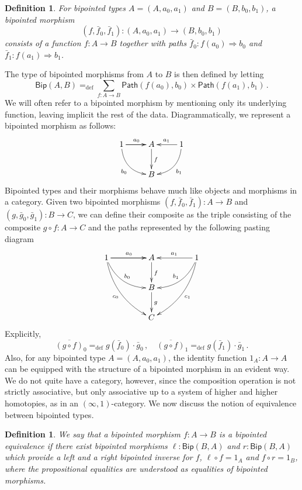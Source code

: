 \documentclass[10pt,a4paper,oneside,reqno]{amsart}
\numberwithin{equation}{section}
\theoremstyle{mythm}
\theoremstyle{mydef}
\newtheorem{definition}[theorem]{Definition}
\theoremstyle{myrmk}
\newcommand{\ie}{\text{i.e.\ }}
\newcommand{\myemph}[1]{\textit{#1}}
\newcommand{\defeq}{=_{\mathrm{def}}}
\newcommand{\co}{\colon}
\newcommand{\Id}{\mathsf{Path}}
\newcommand{\BipHom}{\mathsf{Bip}}
\begin{document}
\begin{definition} For bipointed types $A = (A, a_0, a_1)$ and $B = (B, b_0, b_1)$, a \emph{bipointed morphism} 
\[
(f, \bar{f}_0, \bar{f}_1)  \co (A, a_0, a_1)  \to (B, b_0, b_1)
\] 
consists of a function $f \co A \to B$ together with paths $\bar{f}_0 \co  f(a_0) \Rightarrow b_0$ 
and~$\bar{f}_1 \co f(a_1) \Rightarrow b_1$.  \end{definition}


The type of bipointed morphisms from $A$ to $B$ is then defined by letting
\[
\BipHom(A,B) \defeq \sum_{ f \co A \to B} \Id(  f(a_0), b_0 )  \times \Id(  f(a_1), b_1 ) \, .
\]
We will often refer to a bipointed morphism by mentioning only its underlying function, leaving implicit
the rest of the data. Diagrammatically, we represent a bipointed morphism as follows:
\[
\xymatrix{
1 \ar[r]   \ar[r]^{a_0} \ar@/_1pc/[dr]_{b_0}  & A  \ar[d]^{f} & 1  \ar[l]_{a_1} \ar@/^1pc/[dl]^{b_1} \\
  & B  &  }
 \]
Bipointed types and their morphisms behave much like objects and morphisms in a category.
Given two bipointed morphisms  $(f, \bar{f}_0, \bar{f}_1) \co A \to B$ and $(g, \bar{g}_0, \bar{g}_1) \co B \to C$, we can define their composite 
 as the triple consisting of the composite $g \circ f \co A \to C$ and the paths represented
by the following pasting diagram
\[
\xymatrix@C=1.5cm{
1 \ar[r]   \ar[r]^{a_0}   \ar@/_1pc/[dr]^{b_0} \ar@/_1pc/[ddr]_{c_0}  & A  \ar[d]^{f} & 1 \ar[l]_{a_1}  \ar@/^1pc/[dl]_{b_1}  \ar@/^1pc/[ddl]^{c_1} \\
  & B \ar[d]^g &   \\
  & C &   }
  \]
Explicitly,
\[
\overline{(g \circ f)}_0 \defeq g(\bar{f}_0) \cdot  \bar{g}_0 \, ,   \quad 
\overline{(g \circ f) }_1 \defeq  g(\bar{f}_1) \cdot   \bar{g}_1 \, .
\]
Also, for any bipointed type $A = (A, a_0, a_1)$, the identity function $1_A \co A \to A$ can be equipped with the structure of a 
bipointed morphism in an evident way. 
We do not quite have a category, however, since the composition operation is not strictly associative, but only associative up to a system of higher and higher 
homotopies, as in an $(\infty,1)$-category.  We now discuss the notion of equivalence between bipointed types.



\begin{definition} We say that a bipointed morphism $f \co A \to B$ is a \myemph{bipointed equivalence}
if there exist bipointed morphisms $\ell \co \BipHom(B,A)$ and $r \co \BipHom(B,A)$ which provide a left and a right bipointed inverse for $f$, \ie  $\ell \circ f = 1_A$ and $f \circ r = 1_B$, 
where the propositional equalities are understood as equalities of bipointed morphisms. 
\end{definition}
\end{document}
